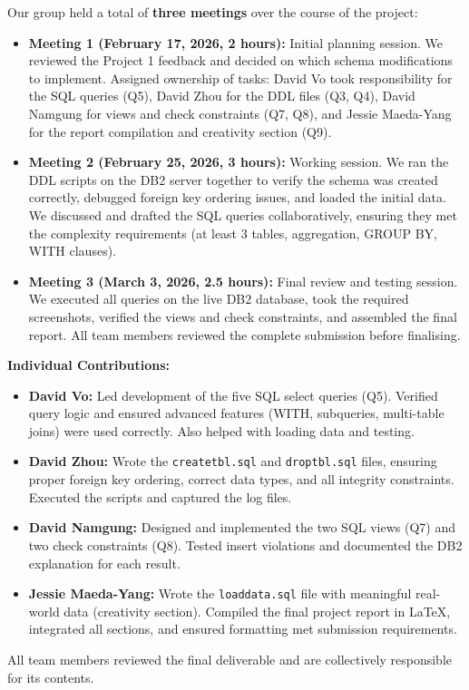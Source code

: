 \documentclass[12pt,letterpaper]{article}
\begin{document}
Our group held a total of \textbf{three meetings} over the course of the project:

\begin{itemize}
    \item \textbf{Meeting 1 (February 17, 2026, 2 hours):} Initial planning session. We reviewed the Project 1 feedback and decided on which schema modifications to implement. Assigned ownership of tasks: David Vo took responsibility for the SQL queries (Q5), David Zhou for the DDL files (Q3, Q4), David Namgung for views and check constraints (Q7, Q8), and Jessie Maeda-Yang for the report compilation and creativity section (Q9).

    \item \textbf{Meeting 2 (February 25, 2026, 3 hours):} Working session. We ran the DDL scripts on the DB2 server together to verify the schema was created correctly, debugged foreign key ordering issues, and loaded the initial data. We discussed and drafted the SQL queries collaboratively, ensuring they met the complexity requirements (at least 3 tables, aggregation, GROUP BY, WITH clauses).

    \item \textbf{Meeting 3 (March 3, 2026, 2.5 hours):} Final review and testing session. We executed all queries on the live DB2 database, took the required screenshots, verified the views and check constraints, and assembled the final report. All team members reviewed the complete submission before finalising.
\end{itemize}

\textbf{Individual Contributions:}
\begin{itemize}
    \item \textbf{David Vo:} Led development of the five SQL select queries (Q5). Verified query logic and ensured advanced features (WITH, subqueries, multi-table joins) were used correctly. Also helped with loading data and testing.

    \item \textbf{David Zhou:} Wrote the \texttt{createtbl.sql} and \texttt{droptbl.sql} files, ensuring proper foreign key ordering, correct data types, and all integrity constraints. Executed the scripts and captured the log files.

    \item \textbf{David Namgung:} Designed and implemented the two SQL views (Q7) and two check constraints (Q8). Tested insert violations and documented the DB2 explanation for each result.

    \item \textbf{Jessie Maeda-Yang:} Wrote the \texttt{loaddata.sql} file with meaningful real-world data (creativity section). Compiled the final project report in \LaTeX, integrated all sections, and ensured formatting met submission requirements.
\end{itemize}

All team members reviewed the final deliverable and are collectively responsible for its contents.
\end{document}
